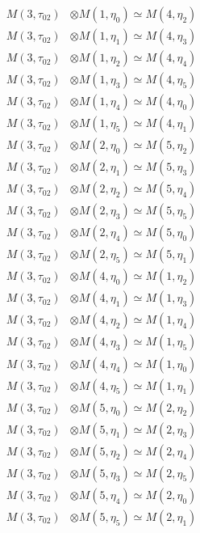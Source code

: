 \begin{align*}
M(3,\tau_{02}) &\otimes M(1,\eta_{0}) \simeq M(4,\eta_{2}) \\
M(3,\tau_{02}) &\otimes M(1,\eta_{1}) \simeq M(4,\eta_{3}) \\
M(3,\tau_{02}) &\otimes M(1,\eta_{2}) \simeq M(4,\eta_{4}) \\
M(3,\tau_{02}) &\otimes M(1,\eta_{3}) \simeq M(4,\eta_{5}) \\
M(3,\tau_{02}) &\otimes M(1,\eta_{4}) \simeq M(4,\eta_{0}) \\
M(3,\tau_{02}) &\otimes M(1,\eta_{5}) \simeq M(4,\eta_{1}) \\
M(3,\tau_{02}) &\otimes M(2,\eta_{0}) \simeq M(5,\eta_{2}) \\
M(3,\tau_{02}) &\otimes M(2,\eta_{1}) \simeq M(5,\eta_{3}) \\
M(3,\tau_{02}) &\otimes M(2,\eta_{2}) \simeq M(5,\eta_{4}) \\
M(3,\tau_{02}) &\otimes M(2,\eta_{3}) \simeq M(5,\eta_{5}) \\
M(3,\tau_{02}) &\otimes M(2,\eta_{4}) \simeq M(5,\eta_{0}) \\
M(3,\tau_{02}) &\otimes M(2,\eta_{5}) \simeq M(5,\eta_{1}) \\
M(3,\tau_{02}) &\otimes M(4,\eta_{0}) \simeq M(1,\eta_{2}) \\
M(3,\tau_{02}) &\otimes M(4,\eta_{1}) \simeq M(1,\eta_{3}) \\
M(3,\tau_{02}) &\otimes M(4,\eta_{2}) \simeq M(1,\eta_{4}) \\
M(3,\tau_{02}) &\otimes M(4,\eta_{3}) \simeq M(1,\eta_{5}) \\
M(3,\tau_{02}) &\otimes M(4,\eta_{4}) \simeq M(1,\eta_{0}) \\
M(3,\tau_{02}) &\otimes M(4,\eta_{5}) \simeq M(1,\eta_{1}) \\
M(3,\tau_{02}) &\otimes M(5,\eta_{0}) \simeq M(2,\eta_{2}) \\
M(3,\tau_{02}) &\otimes M(5,\eta_{1}) \simeq M(2,\eta_{3}) \\
M(3,\tau_{02}) &\otimes M(5,\eta_{2}) \simeq M(2,\eta_{4}) \\
M(3,\tau_{02}) &\otimes M(5,\eta_{3}) \simeq M(2,\eta_{5}) \\
M(3,\tau_{02}) &\otimes M(5,\eta_{4}) \simeq M(2,\eta_{0}) \\
M(3,\tau_{02}) &\otimes M(5,\eta_{5}) \simeq M(2,\eta_{1}) \\
\end{align*}

